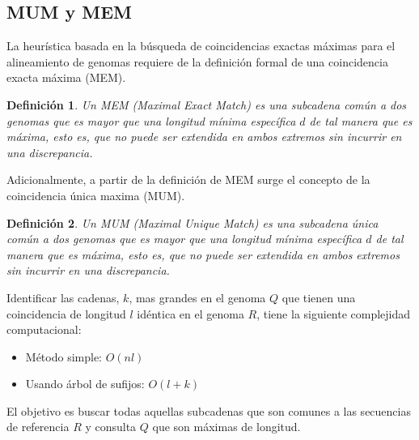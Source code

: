 \documentclass[12pt,a4paper]{article}
\newtheorem{mydef}{Definición}
\begin{document}
\subsection{MUM y MEM} 
\indent
La heurística basada en la búsqueda de coincidencias exactas máximas para el alineamiento de genomas requiere de la definición formal de una coincidencia exacta máxima (MEM).\\
\begin{mydef}
  Un MEM (Maximal Exact Match) es una subcadena común a dos
  genomas que es mayor que una longitud mínima específica $d$ de tal manera
  que es máxima, esto es, que no puede ser extendida en ambos extremos sin
  incurrir en una discrepancia. 
\end{mydef}
\indent
Adicionalmente, a partir de la definición de MEM surge el concepto de la coincidencia única maxima (MUM).\\
\begin{mydef}Un MUM (Maximal Unique Match) es una subcadena única común a dos genomas que es mayor que una longitud mínima específica $d$ de tal manera que es máxima, esto es, que no puede ser extendida en ambos extremos sin incurrir en una discrepancia.
\end{mydef}
Identificar las cadenas, $k$, mas grandes en el genoma $Q$ que tienen una coincidencia de longitud $l$ idéntica en el genoma $R$, tiene la siguiente complejidad computacional:
\begin{itemize}
  \item Método simple: $O(nl)$
  \item Usando árbol de sufijos: $O(l+k)$
\end{itemize}
\indent
El objetivo es buscar todas aquellas subcadenas que son comunes a las secuencias de referencia $R$ y consulta $Q$ que son máximas de longitud.\\
\end{document}
